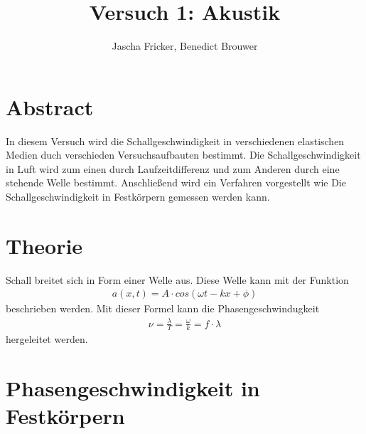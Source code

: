 \documentclass[11pt, a4paper]{article}
\title{Versuch 1: Akustik}
\author{Jascha Fricker, Benedict Brouwer}
\begin{document}
    \maketitle
    

    \section{Abstract}
    In diesem Versuch wird die Schallgeschwindigkeit in verschiedenen elastischen Medien
    duch verschieden Versuchsaufbauten bestimmt. Die Schallgeschwindigkeit in Luft wird zum einen durch
    Laufzeitdifferenz und zum Anderen durch eine stehende Welle bestimmt. Anschließend wird ein Verfahren 
    vorgestellt wie Die Schallgeschwindigkeit in Festkörpern gemessen werden kann.

    \tableofcontents

    \newpage
    
    \section{Theorie}
    Schall breitet sich in Form einer Welle aus. Diese Welle kann mit der Funktion
    \begin{align}
        a(x, t) = A \cdot cos(\omega t-kx+\phi )
    \end{align}
    beschrieben werden. Mit dieser Formel kann die Phasengeschwindugkeit
    \begin{align}
        \nu = \frac{\lambda}{T} = \frac{\omega}{k} = f \cdot \lambda
    \end{align}
    hergeleitet werden. \\
    \section{Phasengeschwindigkeit in Festkörpern}
\end{document}
